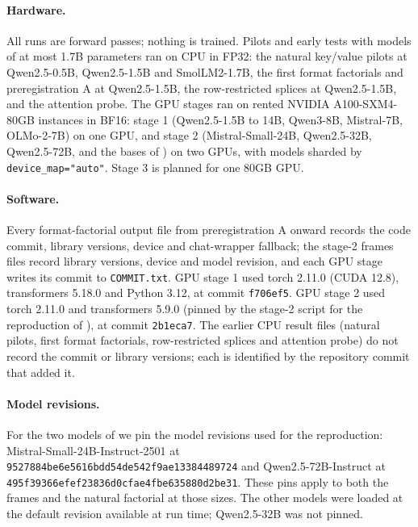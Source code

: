 \paragraph{Hardware.} All runs are forward passes; nothing is trained. Pilots and early tests with models of at most 1.7B parameters ran on CPU in FP32: the natural key/value pilots at Qwen2.5-0.5B, Qwen2.5-1.5B and SmolLM2-1.7B, the first format factorials and preregistration A at Qwen2.5-1.5B, the row-restricted splices at Qwen2.5-1.5B, and the attention probe. The GPU stages ran on rented NVIDIA A100-SXM4-80GB instances in BF16: stage 1 (Qwen2.5-1.5B to 14B, Qwen3-8B, Mistral-7B, OLMo-2-7B) on one GPU, and stage 2 (Mistral-Small-24B, Qwen2.5-32B, Qwen2.5-72B, and the bases of \citet{anonymous2026fitted}) on two GPUs, with models sharded by \texttt{device\_map="auto"}. Stage 3 is planned for one 80GB GPU. 

\paragraph{Software.} Every format-factorial output file from preregistration A onward records the code commit, library versions, device and chat-wrapper fallback; the stage-2 frames files record library versions, device and model revision, and each GPU stage writes its commit to \texttt{COMMIT.txt}. GPU stage 1 used torch 2.11.0 (CUDA 12.8), transformers 5.18.0 and Python 3.12, at commit \texttt{f706ef5}. GPU stage 2 used torch 2.11.0 and transformers 5.9.0 (pinned by the stage-2 script for the reproduction of \citet{anonymous2026fitted}), at commit \texttt{2b1eca7}. The earlier CPU result files (natural pilots, first format factorials, row-restricted splices and attention probe) do not record the commit or library versions; each is identified by the repository commit that added it.

\paragraph{Model revisions.} For the two models of \citet{anonymous2026fitted} we pin the model revisions used for the reproduction: Mistral-Small-24B-Instruct-2501 at \texttt{9527884be6e5616bdd54de542f9ae13384489724} and Qwen2.5-72B-Instruct at \texttt{495f39366efef23836d0cfae4fbe635880d2be31}. These pins apply to both the frames and the natural factorial at those sizes. The other models were loaded at the default revision available at run time; Qwen2.5-32B was not pinned.

